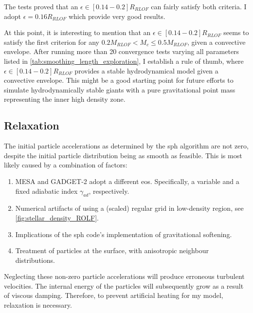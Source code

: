 The tests proved that an $\epsilon \in [0.14-0.2] R_{RLOF}$ can fairly satisfy both criteria. I adopt $\epsilon = 0.16 R_{RLOF}$ which provide very good results.

At this point, it is interesting to mention that an $\epsilon \in [0.14-0.2] R_{RLOF}$ seems to satisfy the first criterion for any $0.2M_{RLOF} < M_c \leq 0.5M_{RLOF}$, given a convective envelope. After running more than 20 convergence tests varying all parameters listed in \cref{tab:smoothing_length_exploration}, I establish a rule of thumb, where $\epsilon \in [0.14-0.2] R_{RLOF}$ provides a stable hydrodynamical model given a convective envelope. This might be a good starting point for future efforts to simulate hydrodynamically stable giants with a pure gravitational point mass representing the inner high density zone.

\subsection{Relaxation}

The initial particle accelerations as determined by the \ac{sph} algorithm are not zero, despite the initial particle distribution being as smooth as feasible. This is most likely caused by a combination of factors:
\begin{enumerate}
    \item MESA and GADGET-2 adopt a different \ac{eos}. Specifically, a variable and a fixed adiabatic index $\gamma_{ad}$, respectively.
    \item Numerical artifacts of using a (scaled) regular grid in low-density region, see \cref{fig:stellar_density_ROLF}.
    \item Implications of the \ac{sph} code's implementation of gravitational softening.
    \item Treatment of particles at the surface, with anisotropic neighbour distributions.
\end{enumerate}
Neglecting these non-zero particle accelerations will produce erroneous turbulent velocities. The internal energy of the particles will subsequently grow as a result of viscous damping. Therefore, to prevent artificial heating for my model, relaxation is necessary.

